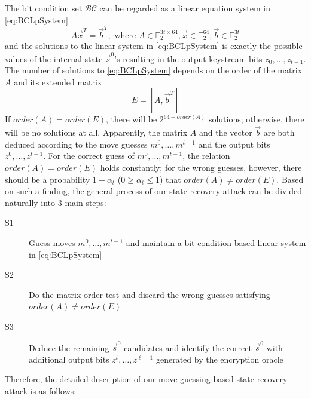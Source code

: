 The bit condition set $\mathcal{BC}$ can be regarded as a linear equation system in \eqref{eq:BCLpSystem}
\begin{equation}\label{eq:BCLpSystem}
  A\vec x^T=\vec b^T, \text{ where } A\in \mathbb{F}_2^{3t\times 64}, \vec x\in \mathbb{F}_2^{64}, \vec b\in \mathbb{F}_2^{3t}
\end{equation}
and the solutions to the linear system in \eqref{eq:BCLpSystem} is exactly the possible values of the internal state $\vec{s}^0$'s resulting in the output keystream bits $z_0,\ldots, z_{t-1}$.
The number of solutions to \eqref{eq:BCLpSystem} depends on the order of the matrix $A$ and its extended matrix
\begin{equation}\label{eq:ExtendedMatrixOfA}
  E=[A,\vec b^T]
\end{equation}
If $order(A)=order(E)$, there will be $2^{64-order(A)}$ solutions; otherwise, there will be no solutions at all.
Apparently, the matrix $A$ and the vector $\vec b$ are both deduced according to the move guesses $m^0,\ldots, m^{t-1}$ and the output bits $z^0,\ldots, z^{t-1}$. 
For the correct guess of $m^0,\ldots, m^{t-1}$, the relation $order(A)=order(E)$ holds constantly; for the wrong guesses, however, there should be a probability $1-\alpha_t$ ($0\geq \alpha_t\leq 1$) that $order(A)\neq order(E)$. 
Based on such a finding, the general process of our state-recovery attack can be divided naturally into 3 main steps:
\begin{description}
  \item[S1] Guess moves $m^0,\ldots, m^{t-1}$ and maintain a bit-condition-based linear system in \eqref{eq:BCLpSystem}
  \item[S2] Do the matrix order test and discard the wrong guesses satisfying  $order(A)\neq order(E)$
  \item[S3] Deduce the remaining $\vec{s}^0$ candidates and identify the correct $\vec{s}^0$ with additional output bits $z^{t},\ldots, z^{\ell-1}$ generated by the encryption oracle
\end{description}
Therefore, the detailed description of our move-guessing-based state-recovery attack is as follows:

